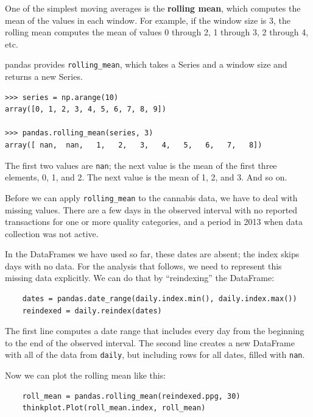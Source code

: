 \documentclass[12pt]{book}
\begin{document}
One of the simplest moving averages is the {\bf rolling mean}, which
computes the mean of the values in each window.  For example, if
the window size is 3, the rolling mean computes the mean of
values 0 through 2, 1 through 3, 2 through 4, etc.

pandas provides \verb"rolling_mean", which takes a Series and a
window size and returns a new Series.

\begin{verbatim}
>>> series = np.arange(10)
array([0, 1, 2, 3, 4, 5, 6, 7, 8, 9])

>>> pandas.rolling_mean(series, 3)
array([ nan,  nan,   1,   2,   3,   4,   5,   6,   7,   8])
\end{verbatim}

The first two values are \verb"nan"; the next value is the mean of
the first three elements, 0, 1, and 2.  The next value is the mean
of 1, 2, and 3.  And so on.

Before we can apply \verb"rolling_mean" to the cannabis data, we
have to deal with missing values.  There are a few days in the
observed interval with no reported transactions for one or more
quality categories, and a period in 2013 when data collection was
not active.

In the DataFrames we have used so far, these dates are absent;
the index skips days with no data.  For the analysis that follows,
we need to represent this missing data explicitly.  We can do
that by ``reindexing'' the DataFrame:

\begin{verbatim}
    dates = pandas.date_range(daily.index.min(), daily.index.max())
    reindexed = daily.reindex(dates)
\end{verbatim}

The first line computes a date range that includes every day from the
beginning to the end of the observed interval.  The second line
creates a new DataFrame with all of the data from \verb"daily", but
including rows for all dates, filled with \verb"nan".

Now we can plot the rolling mean like this:

\begin{verbatim}
    roll_mean = pandas.rolling_mean(reindexed.ppg, 30)
    thinkplot.Plot(roll_mean.index, roll_mean)
\end{verbatim}
\end{document}

